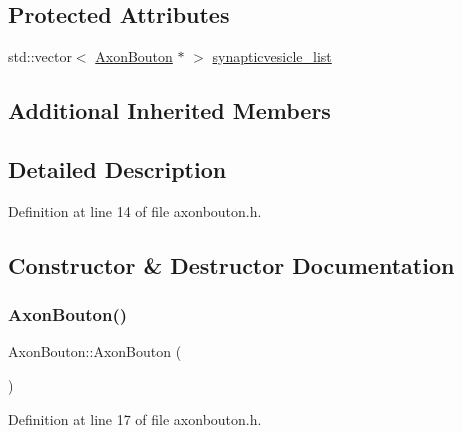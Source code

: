 \subsection*{Protected Attributes}
\begin{DoxyCompactItemize}
\item 
std\+::vector$<$ \mbox{\hyperlink{class_axon_bouton}{Axon\+Bouton}} $\ast$ $>$ \mbox{\hyperlink{class_axon_bouton_ad5b4e9b5fefb2ad9e6dfe5ad91be2dd7}{synapticvesicle\+\_\+list}}
\end{DoxyCompactItemize}
\subsection*{Additional Inherited Members}


\subsection{Detailed Description}


Definition at line 14 of file axonbouton.\+h.



\subsection{Constructor \& Destructor Documentation}
\mbox{\label{class_axon_bouton_acd6521d65ecb2b86abf2e3a8b322699e}} 
\subsubsection{\texorpdfstring{Axon\+Bouton()}{AxonBouton()}\hspace{0.1cm}{\footnotesize\ttfamily [1/4]}}
{\footnotesize\ttfamily Axon\+Bouton\+::\+Axon\+Bouton (\begin{DoxyParamCaption}{ }\end{DoxyParamCaption})\hspace{0.3cm}{\ttfamily [inline]}}



Definition at line 17 of file axonbouton.\+h.

\mbox{\label{class_axon_bouton_a8a2da76b259a5ebab397fbd89d8b0632}} 
